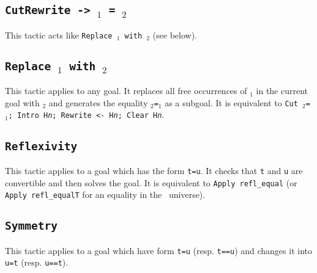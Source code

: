 \subsection{\tt CutRewrite -> \term$_1$ = \term$_2$}
\label{CutRewrite}

This tactic acts like {\tt Replace {\term$_1$} with {\term$_2$}}
(see below).

\subsection{\tt Replace {\term$_1$} with {\term$_2$}}
This tactic applies to any goal. It replaces all free occurrences of
{\term$_1$} in the current goal with {\term$_2$} and generates the
equality {\term$_2$}{\tt =}{\term$_1$} as a subgoal. It is equivalent
to {\tt Cut \term$_2$=\term$_1$; Intro H{\sl n}; Rewrite <- H{\sl n}; 
  Clear H{\sl n}}.

%  
%

\subsection{\tt Reflexivity}
\label{Reflexivity}
This tactic applies to a goal which has the form {\tt t=u}. It checks
that {\tt t} and {\tt u} are convertible and then solves the goal.
It is equivalent to {\tt Apply refl\_equal} (or {\tt Apply
  refl\_equalT} for an equality in the \Type\ universe).

\begin{ErrMsgs}
\item {}
\item {}
\end{ErrMsgs}

\subsection{\tt Symmetry}
This tactic applies to a goal which have form {\tt t=u}
(resp. \texttt{t==u}) and changes it into {\tt u=t} (resp. \texttt{u==t}).

